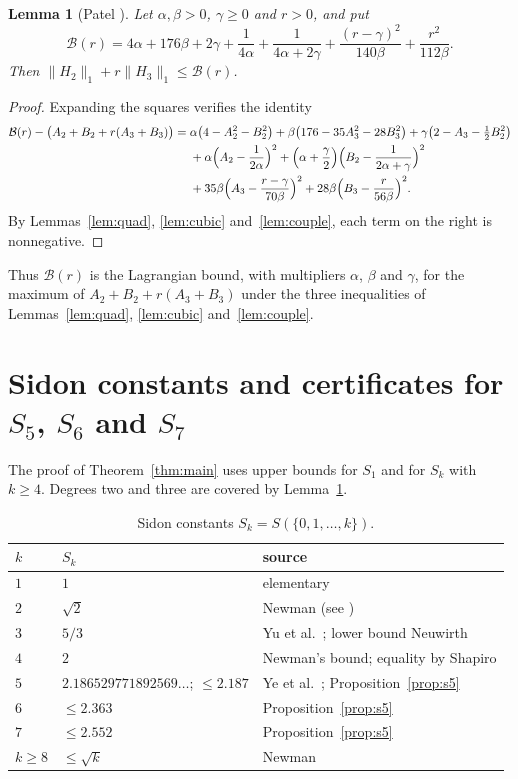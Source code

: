 \documentclass[11pt]{amsart}
\newtheorem{lemma}[theorem]{Lemma}
\theoremstyle{remark}
\numberwithin{equation}{section}
\newcommand{\Bfun}{\mathcal{B}}
\newcommand{\YeVal}{2.186529771892569\ldots}
\newcommand{\FiveOwn}{2.187}
\newcommand{\SixOwn}{2.363}
\newcommand{\SevenOwn}{2.552}
\begin{document}
\begin{lemma}[Patel {\cite{PatMDB}}]\label{lem:combine}
Let $\alpha,\beta>0$, $\gamma\ge0$ and $r>0$, and put
\[
\Bfun(r)=4\alpha+176\beta+2\gamma+\frac1{4\alpha}+\frac1{4\alpha+2\gamma}+\frac{(r-\gamma)^2}{140\beta}+\frac{r^2}{112\beta}.
\]
Then $\|H_2\|_1+r\|H_3\|_1\le\Bfun(r)$.
\end{lemma}

\begin{proof}
Expanding the squares verifies the identity
\begin{align*}
\Bfun(r)-\bigl(A_2+B_2+r(A_3+B_3)\bigr)={}&\alpha\bigl(4-A_2^2-B_2^2\bigr)+\beta\bigl(176-35A_3^2-28B_3^2\bigr)+\gamma\bigl(2-A_3-\tfrac12B_2^2\bigr)\\
&+\alpha\Bigl(A_2-\frac1{2\alpha}\Bigr)^2+\Bigl(\alpha+\frac\gamma2\Bigr)\Bigl(B_2-\frac1{2\alpha+\gamma}\Bigr)^2\\
&+35\beta\Bigl(A_3-\frac{r-\gamma}{70\beta}\Bigr)^2+28\beta\Bigl(B_3-\frac r{56\beta}\Bigr)^2.
\end{align*}
By Lemmas~\ref{lem:quad}, \ref{lem:cubic} and~\ref{lem:couple}, each term on the right is nonnegative.
\end{proof}

Thus $\Bfun(r)$ is the Lagrangian bound, with multipliers $\alpha$, $\beta$ and $\gamma$, for the maximum of $A_2+B_2+r(A_3+B_3)$ under the three inequalities of Lemmas~\ref{lem:quad}, \ref{lem:cubic} and~\ref{lem:couple}.

\section{Sidon constants and certificates for \texorpdfstring{$S_5$, $S_6$ and $S_7$}{small k}}\label{sec:values}

The proof of Theorem~\ref{thm:main} uses upper bounds for $S_1$ and for $S_k$ with $k\ge4$. Degrees two and three are covered by Lemma~\ref{lem:combine}.

\begin{table}[ht]
\centering
\caption{Sidon constants $S_k=S(\{0,1,\dots,k\})$.}\label{tab:sidon}
\begin{tabular}{@{}lll@{}}
\toprule
$k$ & $S_k$ & source\\
\midrule
$1$ & $1$ & elementary\\
$2$ & $\sqrt2$ & Newman (see \cite{Neu01})\\
$3$ & $5/3$ & Yu et al.\ \cite{Yu26}; lower bound Neuwirth \cite{Neu26}\\
$4$ & $2$ & Newman's bound; equality by Shapiro \cite{Sha51}\\
$5$ & $\YeVal$; $\le\FiveOwn$ & Ye et al.\ \cite{Ye26}; Proposition~\ref{prop:s5}\\
$6$ & $\le\SixOwn$ & Proposition~\ref{prop:s5}\\
$7$ & $\le\SevenOwn$ & Proposition~\ref{prop:s5}\\
$k\ge8$ & $\le\sqrt k$ & Newman \cite[Chapter~3]{Sha51}\\
\bottomrule
\end{tabular}
\end{table}
\end{document}
